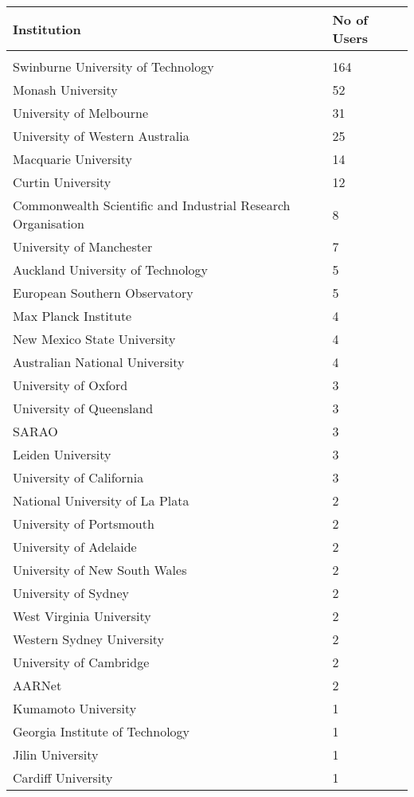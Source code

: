 \documentclass{article}%
\begin{document}
%
\begin{longtabu}{X[l] X[r]}%
\textbf{Institution}&\textbf{No of Users}\\%
\hline%
&\\%
Swinburne University of Technology&164\\%
\hline%
Monash University&52\\%
\hline%
University of Melbourne&31\\%
\hline%
University of Western Australia&25\\%
\hline%
Macquarie University&14\\%
\hline%
Curtin University&12\\%
\hline%
Commonwealth Scientific and Industrial Research Organisation&8\\%
\hline%
University of Manchester&7\\%
\hline%
Auckland University of Technology&5\\%
\hline%
European Southern Observatory&5\\%
\hline%
Max Planck Institute&4\\%
\hline%
New Mexico State University&4\\%
\hline%
Australian National University&4\\%
\hline%
University of Oxford&3\\%
\hline%
University of Queensland&3\\%
\hline%
SARAO&3\\%
\hline%
Leiden University&3\\%
\hline%
University of California&3\\%
\hline%
National University of La Plata&2\\%
\hline%
University of Portsmouth&2\\%
\hline%
University of Adelaide&2\\%
\hline%
University of New South Wales&2\\%
\hline%
University of Sydney&2\\%
\hline%
West Virginia University&2\\%
\hline%
Western Sydney University&2\\%
\hline%
University of Cambridge&2\\%
\hline%
AARNet&2\\%
\hline%
Kumamoto University&1\\%
\hline%
Georgia Institute of Technology&1\\%
\hline%
Jilin University&1\\%
\hline%
Cardiff University&1\\%

\end{longtabu}
\end{document}
